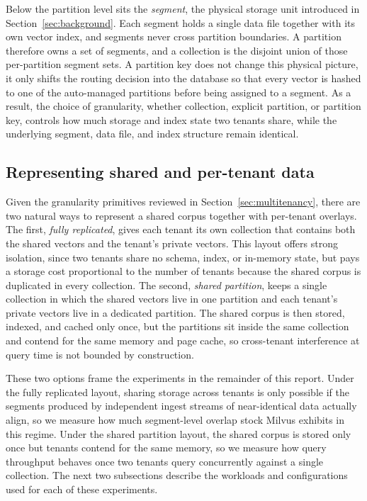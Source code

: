  Below the
partition level sits the \emph{segment}, the physical storage unit
introduced in Section~\ref{sec:background}. Each segment holds a
single data file together with its own vector index, and segments
never cross partition boundaries. A partition therefore owns a set
of segments, and a collection is the disjoint union of those
per-partition segment sets. A partition key does not change this
physical picture, it only shifts the routing decision into the
database so that every vector is hashed to one of the auto-managed
partitions before being assigned to a segment. As a result, the
choice of granularity, whether collection, explicit partition, or
partition key, controls how much storage and index state two tenants
share, while the underlying segment, data file, and index structure
remain identical.

\subsection{Representing shared and per-tenant data}

Given the granularity primitives reviewed in
Section~\ref{sec:multitenancy}, there are two natural ways to
represent a shared corpus together with per-tenant overlays. The
first, \emph{fully replicated}, gives each tenant its own collection
that contains both the shared vectors and the tenant's private vectors.
This layout offers strong isolation, since two tenants share no
schema, index, or in-memory state, but pays a storage cost
proportional to the number of tenants because the shared corpus is
duplicated in every collection. The second, \emph{shared partition},
keeps a single collection in which the shared vectors live in one
partition and each tenant's private vectors live in a dedicated
partition. The shared corpus is then stored, indexed, and cached
only once, but the partitions sit inside the same collection and
contend for the same memory and page cache, so cross-tenant
interference at query time is not bounded by construction.

These two options frame the experiments in the remainder of this
report. Under the fully replicated layout, sharing storage across
tenants is only possible if the segments produced by independent
ingest streams of near-identical data actually align, so we measure
how much segment-level overlap stock Milvus exhibits in this regime.
Under the shared partition layout, the shared corpus is stored only
once but tenants contend for the same memory, so we measure how
query throughput behaves once two tenants query concurrently against
a single collection. The next two subsections describe the workloads
and configurations used for each of these experiments.